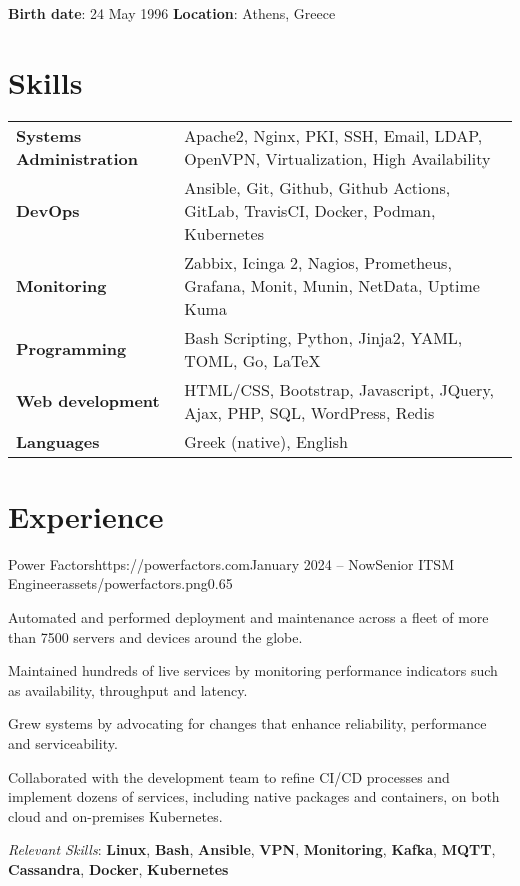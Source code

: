 \documentclass{mycv}
\begin{document}
	\pagestyle{empty}
	\begin{center}
		\textbf{Birth date}: 24 May 1996 {\Large\textperiodcentered} \textbf{Location}: Athens, Greece
	\end{center}
	
	\section{Skills}
	\begin{tabular}{m{4.5cm} m{12.5cm}}
	\textbf{Systems Administration}	& Apache2, Nginx, PKI, SSH, Email, LDAP, OpenVPN, Virtualization, High Availability \\
	\textbf{DevOps}	                & Ansible, Git, Github, Github Actions, GitLab, TravisCI, Docker, Podman, Kubernetes \\
	\textbf{Monitoring}             & Zabbix, Icinga 2, Nagios, Prometheus, Grafana, Monit, Munin, NetData, Uptime Kuma \\
	\textbf{Programming} 	 	   	& Bash Scripting, Python, Jinja2, YAML, TOML, Go, \LaTeX \\
	\textbf{Web development}	   	& HTML/CSS, Bootstrap, Javascript, JQuery, Ajax, PHP, SQL, WordPress, Redis \\
	\textbf{Languages} 			   	& Greek (native), English 
	\end{tabular}

	\section{Experience}

	\begin{EntryDatedLogo}{Power Factors}{https://powerfactors.com}{January 2024 -- Now}{Senior ITSM Engineer}{assets/powerfactors.png}{0.65}
		\begin{Itemize}
			\item Automated and performed deployment and maintenance across a fleet of more than 7500 servers and devices around the globe.
			\item Maintained hundreds of live services by monitoring performance indicators such as availability, throughput and latency.
			\item Grew systems by advocating for changes that enhance reliability, performance and serviceability.
			\item Collaborated with the development team to refine CI/CD processes and implement dozens of services, including native packages and containers, on both cloud and on-premises Kubernetes.
		\end{Itemize}
		\vspace{-0.3cm}
		\textit{Relevant Skills}: \textbf{Linux}, \textbf{Bash}, \textbf{Ansible}, \textbf{VPN}, \textbf{Monitoring}, \textbf{Kafka}, \textbf{MQTT}, \textbf{Cassandra}, \textbf{Docker}, \textbf{Kubernetes}
	\end{EntryDatedLogo}
	
\end{document}
